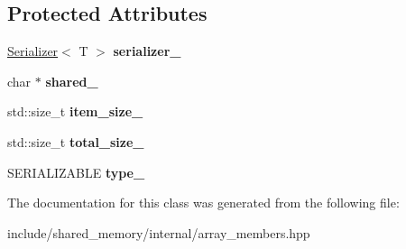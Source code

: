\subsection*{Protected Attributes}
\begin{DoxyCompactItemize}
\item 
\mbox{\label{classshared__memory_1_1internal_1_1array__members_a277e877df362970ef3bc3afdc1c405f8}} 
\hyperlink{classshared__memory_1_1Serializer}{Serializer}$<$ T $>$ {\bfseries serializer\+\_\+}
\item 
\mbox{\label{classshared__memory_1_1internal_1_1array__members_a43d6cb2ddca3c64b5ddf9179385e0156}} 
char $\ast$ {\bfseries shared\+\_\+}
\item 
\mbox{\label{classshared__memory_1_1internal_1_1array__members_abd1f5a78fd25466746fcdb172c824007}} 
std\+::size\+\_\+t {\bfseries item\+\_\+size\+\_\+}
\item 
\mbox{\label{classshared__memory_1_1internal_1_1array__members_ac7dc62a93b0836545cd31e824ab89686}} 
std\+::size\+\_\+t {\bfseries total\+\_\+size\+\_\+}
\item 
\mbox{\label{classshared__memory_1_1internal_1_1array__members_a5f899d0844d266a9041766d6f07da183}} 
S\+E\+R\+I\+A\+L\+I\+Z\+A\+B\+LE {\bfseries type\+\_\+}
\end{DoxyCompactItemize}


The documentation for this class was generated from the following file\+:\begin{DoxyCompactItemize}
\item 
include/shared\+\_\+memory/internal/array\+\_\+members.\+hpp\end{DoxyCompactItemize}

